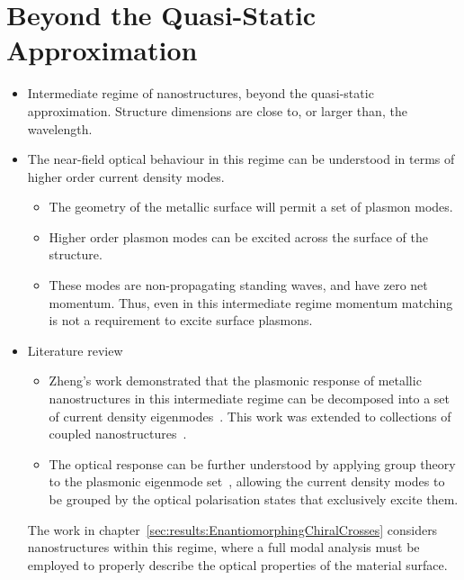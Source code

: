 \section{Beyond the Quasi-Static Approximation}
\begin{itemize}
    \item Intermediate regime of nanostructures, beyond the quasi-static approximation. Structure dimensions are close to, or larger than, the wavelength.
    \item The near-field optical behaviour in this regime can be understood in terms of higher order current density modes.
    \begin{itemize}
        \item The geometry of the metallic surface will permit a set of plasmon modes.
        \item Higher order plasmon modes can be excited across the surface of the structure.
        \item These modes are non-propagating standing waves, and have zero net momentum. Thus, even in this intermediate regime momentum matching is not a requirement to excite surface plasmons.
    \end{itemize}
    \item Literature review
    \begin{itemize}
        \item Zheng's work demonstrated that the plasmonic response of metallic nanostructures in this intermediate regime can be decomposed into a set of current density eigenmodes~\cite{Zheng2012}. This work was extended to collections of coupled nanostructures~\cite{Zheng2013}. 
        \item The optical response can be further understood by applying group theory to the plasmonic eigenmode set~\cite{Zheng2015}, allowing the current density modes to be grouped by the optical polarisation states that exclusively excite them.
    \end{itemize}

    The work in chapter~\ref{sec:results:EnantiomorphingChiralCrosses} considers nanostructures within this regime, where a full modal analysis must be employed to properly describe the optical properties of the material surface.
\end{itemize}




